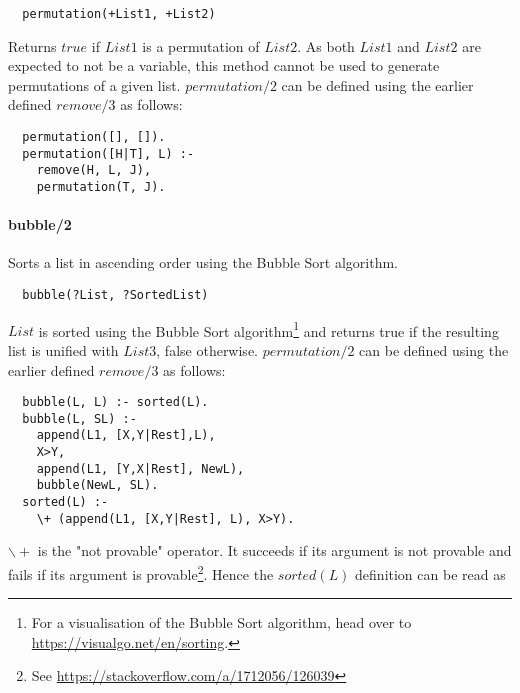 \documentclass{article}
\begin{document}
\begin{multicols}{2}
  \begin{lstlisting}
  permutation(+List1, +List2)
  \end{lstlisting}
  
  Returns $true$ if $List1$ is a permutation of $List2$. As both $List1$ and $List2$ are expected to not be a variable, this method cannot be used to generate permutations of a given list. $permutation/2$ can be defined using the earlier defined $remove/3$ as follows:

  \begin{lstlisting}
  permutation([], []).
  permutation([H|T], L) :-
    remove(H, L, J),
    permutation(T, J).
  \end{lstlisting}  
  
  \paragraph{bubble/2} Sorts a list in ascending order using the Bubble Sort algorithm.
  
  \begin{lstlisting}
  bubble(?List, ?SortedList)
  \end{lstlisting}
  
  $List$ is sorted using the Bubble Sort algorithm\footnote{For a visualisation of the Bubble Sort algorithm, head over to \href{https://visualgo.net/en/sorting}{https://visualgo.net/en/sorting}.} and returns true if the resulting list is unified with $List3$, false otherwise. $permutation/2$ can be defined using the earlier defined $remove/3$ as follows:

  \begin{lstlisting}
  bubble(L, L) :- sorted(L).
  bubble(L, SL) :-
    append(L1, [X,Y|Rest],L),
    X>Y,
    append(L1, [Y,X|Rest], NewL),
    bubble(NewL, SL).
  sorted(L) :-
    \+ (append(L1, [X,Y|Rest], L), X>Y).
  \end{lstlisting}  

  $\backslash+$ is the "not provable" operator. It succeeds if its argument is not provable and fails if its argument is provable\footnote{See \href{https://stackoverflow.com/a/1712056/126039}{https://stackoverflow.com/a/1712056/126039}}. Hence the $sorted(L)$ definition can be read as 
 
  \end{multicols}
\end{document}
